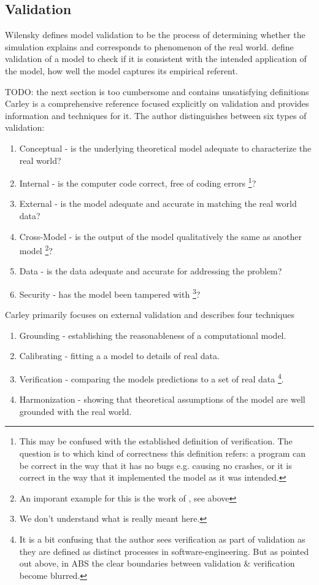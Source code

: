 \subsection{Validation}
Wilensky \cite{wilensky_making_2007} defines model validation to be the process of determining whether the simulation explains and corresponds to phenomenon of the real world. \cite{galan_errors_2009} define validation of a model to check if it is consistent with the intended application of the model, how well the model captures its empirical referent.

TODO: the next section is too cumbersome and contains unsatisfying definitions
Carley \cite{carley_validating_1996} is a comprehensive reference focused explicitly on validation and provides information and techniques for it. The author distinguishes between six types of validation:
\begin{enumerate}
	\item Conceptual - is the underlying theoretical model adequate to characterize the real world?
	\item Internal - is the computer code correct, free of coding errors \footnote{This may be confused with the established definition of verification. The question is to which kind of correctness this definition refers: a program can be correct in the way that it has no bugs e.g. causing no crashes, or it is correct in the way that it implemented the model as it was intended.}?
	\item External - is the model adequate and accurate in matching the real world data?
	\item Cross-Model - is the output of the model qualitatively the same as another model \footnote{An imporant example for this is the work of \cite{axtell_aligning_1996}, see above}?
	\item Data - is the data adequate and accurate for addressing the problem?
	\item Security - has the model been tampered with \footnote{We don't understand what is really meant here.}?
\end{enumerate}
Carley primarily focuses on external validation and describes four techniques 
\begin{enumerate}
	\item Grounding - establishing the reasonableness of a computational model.
	\item Calibrating - fitting a a model to details of real data.
	\item Verification - comparing the models predictions to a set of real data \footnote{It is a bit confusing that the author sees verification as part of validation as they are defined as distinct processes in software-engineering. But as pointed out above, in ABS the clear boundaries between validation \& verification become blurred.}.
	\item Harmonization - showing that theoretical assumptions of the model are well grounded with the real world.
\end{enumerate}

